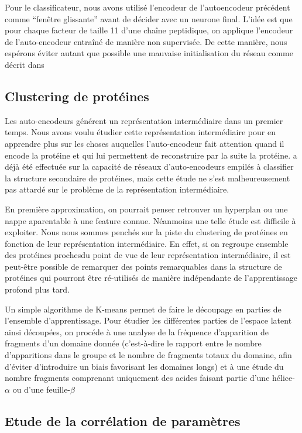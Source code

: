 \documentclass[a4paper, journal, 11pt, onecolumn]{IEEEtran}
\begin{document}
Pour le classificateur, nous avons
utilisé l'encodeur de l'autoencodeur précédent comme ``fenêtre glissante''
avant de décider avec un neurone final. L'idée est que pour chaque facteur de
taille 11 d'une chaîne peptidique, on applique l'encodeur de l'auto-encodeur
entraîné de manière non supervisée. De cette manière, nous espérons éviter
autant que possible une mauvaise initialisation du réseau comme décrit dans \cite{vincent2010stacked}

\subsection{Clustering de protéines}

Les auto-encodeurs générent un représentation intermédiaire dans un premier
temps. Nous avons voulu étudier cette représentation intermédiaire pour en
apprendre plus sur les choses auquelles l'auto-encodeur fait attention quand il
encode la protéine et qui lui permettent de reconstruire par la suite la
protéine. \cite{jian2013predicting} a déjà été effectuée sur la capacité de réseaux d'auto-encodeurs
empilés à classifier la structure secondaire de protéines, mais cette étude ne
s'est malheureusement pas attardé sur le problème de la représentation intermédiaire.

En première approximation, on pourrait penser retrouver un hyperplan ou une
nappe aparentable à une feature connue. Néanmoins une telle étude est difficile
à exploiter. Nous nous sommes penchés sur la piste du clustering
de protéines en fonction de leur représentation intermédiaire. En effet, si on
regroupe ensemble des protéines \og proches\fg du point de vue de leur
représentation intermédiaire, il est peut-être possible de remarquer
des points remarquables dans la structure de protéines qui pourront être
ré-utilisés de manière indépendante de l'apprentissage profond plus tard.

Un simple algorithme de K-means permet de faire le découpage en parties de
l'ensemble d'apprentissage. Pour étudier les différentes parties de l'espace
latent ainsi découpées, on procéde à une analyse de la fréquence d'apparition de
fragments d'un domaine donnée (c'est-à-dire le rapport entre le nombre
d'apparitions dans le groupe et le nombre de fragments totaux du domaine, afin
d'éviter d'introduire un biais favorisant les domaines longs) et à une étude du
nombre fragments comprenant uniquement des acides faisant partie d'une
hélice-$\alpha$ ou d'une feuille-$\beta$

\subsection{Etude de la corrélation de paramètres}
\end{document}
